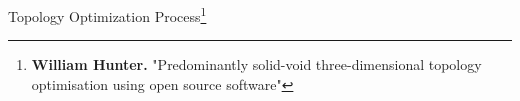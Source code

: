 \begin{frame}{Topology Optimization Process\footnote{\scriptsize{\textbf{William Hunter.} "Predominantly solid-void three-dimensional topology optimisation using open source software"}}}
\begin{overlayarea}{\textwidth}{.8\textheight}
\end{overlayarea}
\end{frame}

